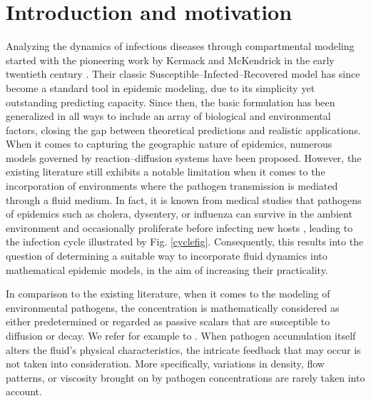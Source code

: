 \documentclass[10pt,number,preprint,times]{elsarticle}
\numberwithin{equation}{section} %
\begin{document}
	\def\l({\left(}
	\def\r){\right)}
	\section{Introduction and motivation}\label{intro}
Analyzing the dynamics of infectious diseases through compartmental modeling started with the pioneering work by Kermack and McKendrick in the early twentieth century \cite{kermack1927contribution}. Their classic Susceptible–Infected–Recovered model has since become a standard tool in epidemic modeling, due to its simplicity yet outstanding predicting capacity. Since then, the basic formulation has been generalized in all ways to include an array of biological and environmental factors, closing the gap between theoretical predictions and realistic applications. When it comes to capturing the geographic nature of epidemics, numerous models governed by reaction–diffusion systems have been proposed. However, the existing literature still exhibits a notable limitation when it comes to the incorporation of environments where the pathogen transmission is mediated through a fluid medium. In fact, it is known from medical studies that pathogens of epidemics such as cholera, dysentery, or influenza can survive in the ambient environment and occasionally proliferate before infecting new hosts \cite{morse1995factors,lipp2002effects,gu2025distinct}, leading to the infection cycle illustrated by Fig. \ref{cyclefig}. Consequently, this results into the question of determining a suitable way to incorporate fluid dynamics into mathematical epidemic models, in the aim of increasing their practicality. 



In comparison to the existing literature, when it comes to the modeling of environmental pathogens, the concentration is mathematically considered as either predetermined or regarded as passive scalars that are susceptible to diffusion or decay. We refer for example to \cite{capasso1978global,el2020mathematical,dong2022global,mehdaoui2024well,mehdaouii2023analysis,mehdaoui2023dynamical,sabbar2025refining,sabbar2024probabilistic,zagour2024time,mehdaoui2024optimal,wang2016reaction,hau2006wind,lacitignola2016backward,buonomo2012forces,shuai2013global,wang2025effect,mehdaoui2024new,zhang2018spatial,yang2025reaction}. When pathogen accumulation itself alters the fluid's physical characteristics, the intricate feedback that may occur is not taken into consideration. More specifically, variations in density, flow patterns, or viscosity brought on by pathogen concentrations are rarely taken into account.
	
\end{document}
